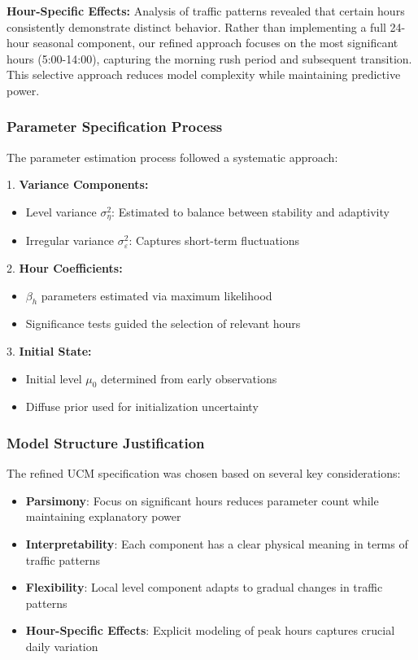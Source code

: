 \documentclass{article}
\begin{document}
\textbf{Hour-Specific Effects:}
Analysis of traffic patterns revealed that certain hours consistently demonstrate distinct behavior. Rather than implementing a full 24-hour seasonal component, our refined approach focuses on the most significant hours (5:00-14:00), capturing the morning rush period and subsequent transition. This selective approach reduces model complexity while maintaining predictive power.

\subsubsection{Parameter Specification Process}
The parameter estimation process followed a systematic approach:

1. \textbf{Variance Components:}
   \begin{itemize}
       \item Level variance $\sigma^2_\eta$: Estimated to balance between stability and adaptivity
       \item Irregular variance $\sigma^2_\varepsilon$: Captures short-term fluctuations
   \end{itemize}

2. \textbf{Hour Coefficients:}
   \begin{itemize}
       \item $\beta_h$ parameters estimated via maximum likelihood
       \item Significance tests guided the selection of relevant hours
   \end{itemize}

3. \textbf{Initial State:}
   \begin{itemize}
       \item Initial level $\mu_0$ determined from early observations
       \item Diffuse prior used for initialization uncertainty
   \end{itemize}

\subsubsection{Model Structure Justification}
The refined UCM specification was chosen based on several key considerations:

\begin{itemize}
    \item \textbf{Parsimony}: Focus on significant hours reduces parameter count while maintaining explanatory power
    \item \textbf{Interpretability}: Each component has a clear physical meaning in terms of traffic patterns
    \item \textbf{Flexibility}: Local level component adapts to gradual changes in traffic patterns
    \item \textbf{Hour-Specific Effects}: Explicit modeling of peak hours captures crucial daily variation
\end{itemize}
\end{document}
